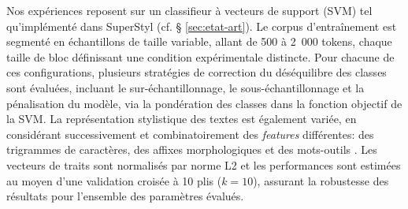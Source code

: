 \documentclass[final, fra]{anthology-ch}
\begin{document}
Nos expériences reposent sur un classifieur à vecteurs de support (SVM) tel qu'implémenté dans SuperStyl \cite{camps_cafiero_2024} (cf. § \ref{sec:etat-art}).
Le corpus d’entraînement est segmenté en échantillons de taille variable, allant de 500 à 2~000 tokens, chaque taille de bloc définissant une condition expérimentale distincte.
Pour chacune de ces configurations, plusieurs stratégies de correction du déséquilibre des classes sont évaluées, incluant le sur-échantillonnage, le sous-échantillonnage et la pénalisation du modèle, via la pondération des classes dans la fonction objectif de la SVM. La représentation stylistique des textes est également variée, en considérant successivement et combinatoirement des \textit{features} différentes: des trigrammes de caractères, des affixes morphologiques et des mots-outils \cite{kestemont2014, sapkota2015}.
Les vecteurs de traits sont normalisés par norme L2 et les performances sont estimées au moyen d’une validation croisée à 10 plis ($k = 10$), assurant la robustesse des résultats pour l’ensemble des paramètres évalués.
\end{document}
